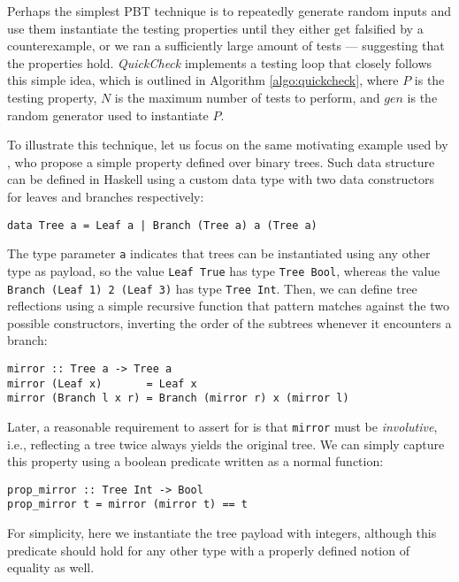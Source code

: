 \documentclass[acmsmall, anonymous]{acmart}
\newcommand{\quickcheck}{\textit{QuickCheck}\xspace}
\begin{document}
Perhaps the simplest PBT technique is to repeatedly generate random inputs and
use them instantiate the testing properties until they either get falsified by a
counterexample, or we ran a sufficiently large amount of tests --- suggesting
that the properties hold.
%
\quickcheck implements a testing loop that closely follows this simple idea,
which is outlined in Algorithm \ref{algo:quickcheck}, where $P$ is the testing
property, $N$ is the maximum number of tests to perform, and $gen$ is the random
generator used to instantiate $P$.



To illustrate this technique, let us focus on the same motivating example used
by \citeauthor{lampropoulos2019coverage}, who propose a simple property defined over
binary trees.
%
Such data structure can be defined in Haskell using a custom data type with two
data constructors for leaves and branches respectively:

\begin{verbatim}
data Tree a = Leaf a | Branch (Tree a) a (Tree a)
\end{verbatim}

\noindent The type parameter \texttt{a} indicates that trees can be instantiated
using any other type as payload, so the value \texttt{Leaf True} has type
\texttt{Tree Bool}, whereas the value \texttt{Branch (Leaf 1) 2 (Leaf 3)} has
type \texttt{Tree Int}.
%
Then, we can define tree reflections using a simple recursive function that
pattern matches against the two possible constructors, inverting the order of
the subtrees whenever it encounters a branch:

\begin{verbatim}
mirror :: Tree a -> Tree a
mirror (Leaf x)       = Leaf x
mirror (Branch l x r) = Branch (mirror r) x (mirror l)
\end{verbatim}

Later, a reasonable requirement to assert for is that \texttt{mirror} must be
\emph{involutive}, i.e., reflecting a tree twice always yields the original
tree.
%
We can simply capture this property using a boolean predicate written as a
normal function:

\begin{verbatim}
prop_mirror :: Tree Int -> Bool
prop_mirror t = mirror (mirror t) == t
\end{verbatim}

\noindent For simplicity, here we instantiate the tree payload with integers,
although this predicate should hold for any other type with a properly defined
notion of equality as well.
\end{document}
